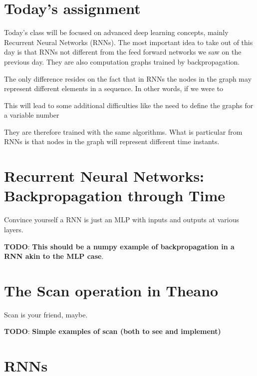 \section{Today's assignment}
Today's class will be focused on advanced deep learning concepts, mainly
Recurrent Neural Networks (RNNs). The most important idea to take out of this day is that RNNs 
not different from the feed forward networks we saw on the previous day. They
are also computation graphs trained by backpropagation. 


The only difference resides on the fact that in RNNs the nodes in the graph may represent different elements in a sequence. In other words, if we were to

This will lead to some additional difficulties like the need to define the graphs for a variable number 


They are therefore trained with the same algorithms. What is particular from RNNs is that nodes in the graph will represent different time instants. 

\section{Recurrent Neural Networks: Backpropagation through Time}

\begin{exercise}
Convince yourself a RNN is just an MLP with inputs and outputs at various
layers. 

\textbf{TODO}:
\textbf{This should be a numpy example of backpropagation in a RNN akin to the MLP case}.
 
\end{exercise}

\section{The Scan operation in Theano}

\begin{exercise}
Scan is your friend, maybe. 

\textbf{TODO}:
\textbf{Simple examples of scan (both to see and implement)}
\end{exercise}

\section{RNNs}


